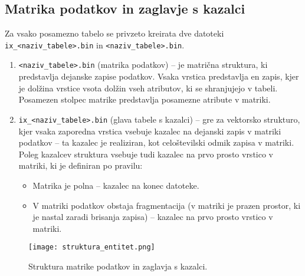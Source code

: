 \documentclass[a4paper,12pt,openright]{book}
\begin{document}
        \subsection{Matrika podatkov in zaglavje s kazalci}
        Za vsako posamezno tabelo se privzeto kreirata dve datoteki {\tt ix\_<naziv\_tabele>.bin} in {\tt <naziv\_tabele>.bin}.
        \begin{enumerate}
            \item {\tt <naziv\_tabele>.bin} (matrika podatkov) – je matrična struktura, ki predstavlja dejanske zapise podatkov. Vsaka vrstica predstavlja en zapis, kjer je dolžina vrstice vsota dolžin vseh atributov, ki se shranjujejo v tabeli. Posamezen stolpec matrike predstavlja posamezne atribute v matriki.
            \item {\tt ix\_<naziv\_tabele>.bin} (glava tabele s kazalci) – gre za vektorsko strukturo, kjer vsaka zaporedna vrstica vsebuje kazalec na dejanski zapis v matriki podatkov – ta kazalec je realiziran, kot celoštevilski odmik zapisa v matriki. Poleg kazalcev struktura vsebuje tudi kazalec na prvo prosto vrstico v matriki, ki je definiran po pravilu:
            \begin{itemize}
                \item Matrika je polna – kazalec na konec datoteke.
                \item V matriki podatkov obstaja fragmentacija (v matriki je prazen prostor, ki je nastal zaradi brisanja zapisa) – kazalec na prvo prosto vrstico v matriki.
            \end{itemize}
        \end{enumerate}

        \begin{figure}[h]
            \centerline{\texttt{[image: struktura\_entitet.png]}}
            \caption{Struktura matrike podatkov in zaglavja s kazalci.}
            \label{sl:mindmap}
        \end{figure}
        
\end{document}
